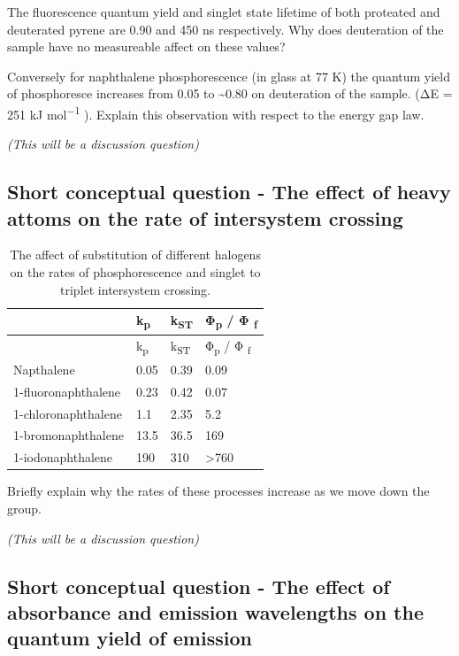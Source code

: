 \documentclass[
]{book}
\begin{document}
The fluorescence quantum yield and singlet state lifetime of both proteated and deuterated pyrene are 0.90 and 450 ns respectively. Why does deuteration of the sample have no measureable affect on these values?

Conversely for naphthalene phosphorescence (in glass at 77 K) the quantum yield of phosphoresce increases from 0.05 to \textasciitilde0.80 on deuteration of the sample. (ΔE = 251 kJ mol\textsuperscript{−1} ). Explain this observation with respect to the energy gap law.

\emph{(This will be a discussion question)}

\hypertarget{sec:heavy}{%
\subsection{Short conceptual question - The effect of heavy attoms on the rate of intersystem crossing}\label{sec:heavy}}

\begin{longtable}[]{@{}llll@{}}
\caption{\label{tab:heavyatom} The affect of substitution of different halogens on the rates of phosphorescence and singlet to triplet intersystem crossing.}\tabularnewline
\toprule
& k\textsubscript{p} & k\textsubscript{ST} & Φ\textsubscript{p} / Φ \textsubscript{f} \\
\midrule
\endfirsthead
\toprule
& k\textsubscript{p} & k\textsubscript{ST} & Φ\textsubscript{p} / Φ \textsubscript{f} \\
\midrule
\endhead
Napthalene & 0.05 & 0.39 & 0.09 \\
1-fluoronaphthalene & 0.23 & 0.42 & 0.07 \\
1-chloronaphthalene & 1.1 & 2.35 & 5.2 \\
1-bromonaphthalene & 13.5 & 36.5 & 169 \\
1-iodonaphthalene & 190 & 310 & \textgreater760 \\
\bottomrule
\end{longtable}

Briefly explain why the rates of these processes increase as we move down the group.

\emph{(This will be a discussion question)}

\hypertarget{sec:osphen}{%
\subsection{Short conceptual question - The effect of absorbance and emission wavelengths on the quantum yield of emission}\label{sec:osphen}}
\end{document}
